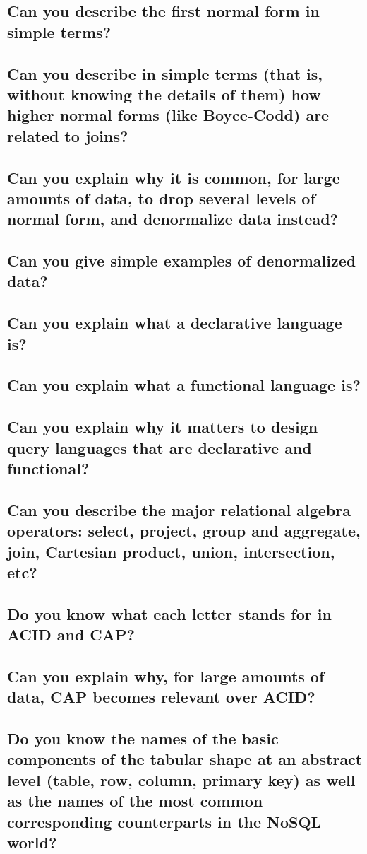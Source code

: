 \documentclass{article}
\begin{document}
\subsection{Can you describe the first normal form in simple terms?}
\subsection{Can you describe in simple terms (that is, without knowing the details of them) how higher normal forms (like Boyce-Codd) are related to joins?}
\subsection{Can you explain why it is common, for large amounts of data, to drop several levels of normal form, and denormalize data instead?}
\subsection{Can you give simple examples of denormalized data?}
\subsection{Can you explain what a declarative language is?}
\subsection{Can you explain what a functional language is?}
\subsection{Can you explain why it matters to design query languages that are declarative and functional?}
\subsection{Can you describe the major relational algebra operators: select, project, group and aggregate, join, Cartesian product, union, intersection, etc?}
\subsection{Do you know what each letter stands for in ACID and CAP?}
\subsection{Can you explain why, for large amounts of data, CAP becomes relevant over ACID?}
\subsection{Do you know the names of the basic components of the tabular shape at an abstract level (table, row, column, primary key) as well as the names of the most common corresponding counterparts in the NoSQL world?}
\end{document}
